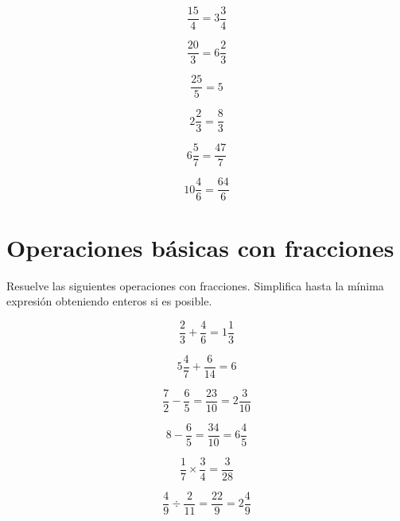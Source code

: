 \documentclass[11pt]{article}
\begin{document}
\begin{multicols}{3}

\begin{equation}    \frac{15}{4}=3\frac{3}{4}   \nonumber\end{equation}

\begin{equation}    \frac{20}{3}=6\frac{2}{3}   \nonumber\end{equation}

\begin{equation}    \frac{25}{5}=5              \nonumber\end{equation}

\begin{equation}    2\frac{2}{3}=\frac{8}{3}    \nonumber\end{equation}

\begin{equation}    6\frac{5}{7}=\frac{47}{7}   \nonumber\end{equation}

\begin{equation}    10\frac{4}{6}=\frac{64}{6}  \nonumber\end{equation}

\end{multicols}

\vspace{0.5cm}

\section{Operaciones b\'asicas con fracciones}
Resuelve las siguientes operaciones con fracciones. Simplifica hasta la m\'inima
expresi\'on obteniendo enteros si es posible.

\begin{multicols}{2}

\begin{equation*}   \frac{2}{3}+\frac{4}{6}=1\frac{1}{3}     \end{equation*}

\begin{equation*}   5\frac{4}{7}+\frac{6}{14}=6              \end{equation*}

\begin{equation*}   \frac{7}{2}-\frac{6}{5}=\frac{23}{10} =2\frac{3}{10} \end{equation*}

\begin{equation*}   8-\frac{6}{5}=\frac{34}{10}=6\frac{4}{5} \end{equation*}

\begin{equation*}   \frac{1}{7}\times\frac{3}{4}=\frac{3}{28}\end{equation*}

\begin{equation*}   \frac{4}{9}\div\frac{2}{11}=\frac{22}{9}=2\frac{4}{9} \end{equation*}

\end{multicols}
\end{document}
